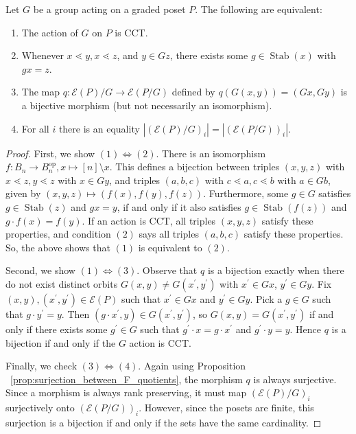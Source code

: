 \documentclass[smallextended, envcountsame, numbook]{svjour3}
\numberwithin{equation}{section}
\renewcommand{\iff}{\Leftrightarrow}
\newcommand\Stab{\operatorname{Stab}}
\newcommand\op{\operatorname{op}}
\begin{document}
\begin{lemma}
\label{lem:cover_transitive_equivalence}
Let $G$ be a group acting on a graded poset $P$. The following are equivalent:
\begin{enumerate}
  \item The action of $G$ on $P$ is CCT.
  \item Whenever $x \lessdot y,x \lessdot z$, and $y \in Gz$, there exists some $g \in \Stab(x)$ with $gx = z$.
  \item The map $q\colon \mathcal E(P)/G\rightarrow \mathcal E(P/G)$ defined by $q(G(x, y)) = (Gx,Gy)$ is a bijective morphism (but not necessarily an isomorphism).
  \item For all $i$ there is an equality $|(\mathcal E(P)/G)_i|=| (\mathcal E(P/G))_i|$.
\end{enumerate}
\end{lemma}
\begin{proof}
First, we show $(1) \iff (2)$. There is an isomorphism $f\colon B_n \rightarrow B_n^{\op},x \mapsto [n]\setminus x$. This defines a bijection between triples $(x,y,z)$ with $x \lessdot z,y \lessdot z$ with $x \in Gy$, and triples $(a,b,c)$ with $c \lessdot a, c \lessdot b$ with $a \in Gb$, given by $(x,y,z)\mapsto (f(x),f(y),f(z))$. Furthermore, some $g \in G$ satisfies $g \in \Stab(z)$ and $gx = y$, if and only if it also satisfies $g \in \Stab(f(z))$ and $g\cdot f(x) = f(y)$. If an action is CCT, all triples $(x,y,z)$ satisfy these properties, and condition $(2)$ says all triples $(a,b,c)$ satisfy these properties. So, the above shows that $(1)$ is equivalent to $(2)$.

Second, we show $(1) \iff (3)$. Observe that $q$ is a bijection exactly when there do not exist distinct orbits $G(x, y) \ne G(x^\prime, y^\prime)$ with $x^\prime\in Gx$, $y^\prime\in Gy$.  Fix $(x, y), (x^\prime, y^\prime)\in \mathcal E(P)$ such that $x^\prime\in Gx$ and $y^\prime\in Gy$.  Pick a $g\in G$ such that $g\cdot y^\prime = y$.  Then $(g\cdot x^\prime, y)\in G(x^\prime, y^\prime)$, so $G(x, y) = G(x^\prime, y^\prime)$ if and only if there exists some $g^\prime\in G$ such that $g^\prime\cdot x = g\cdot x^\prime$ and $g^\prime\cdot y = y$. Hence $q$ is a bijection if and only if the $G$ action is CCT.

Finally, we check $(3)\iff (4)$. Again using Proposition ~\ref{prop:surjection_between_F_quotients}, the morphism $q$ is always surjective. Since a morphism is always rank preserving, it must map $(\mathcal E(P)/G)_i$ surjectively onto $(\mathcal E(P/G))_i$. However, since the posets are finite, this surjection is a bijection if and only if the sets have the same cardinality.
\end{proof}
\end{document}
